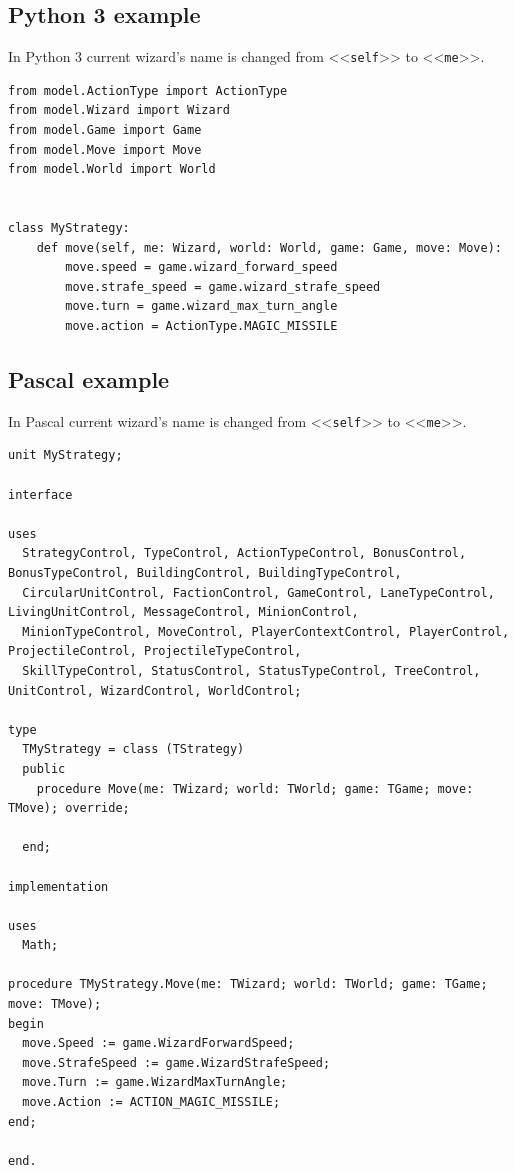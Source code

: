 \subsection{Python 3 example}

In Python 3 current wizard's name is changed from <<\texttt{self}>> to <<\texttt{me}>>.

\begin{verbatim}
from model.ActionType import ActionType
from model.Wizard import Wizard
from model.Game import Game
from model.Move import Move
from model.World import World


class MyStrategy:
    def move(self, me: Wizard, world: World, game: Game, move: Move):
        move.speed = game.wizard_forward_speed
        move.strafe_speed = game.wizard_strafe_speed
        move.turn = game.wizard_max_turn_angle
        move.action = ActionType.MAGIC_MISSILE
\end{verbatim}

\newpage
\subsection{Pascal example}

In Pascal current wizard's name is changed from <<\texttt{self}>> to <<\texttt{me}>>.

\begin{verbatim}
unit MyStrategy;

interface

uses
  StrategyControl, TypeControl, ActionTypeControl, BonusControl, BonusTypeControl, BuildingControl, BuildingTypeControl,
  CircularUnitControl, FactionControl, GameControl, LaneTypeControl, LivingUnitControl, MessageControl, MinionControl,
  MinionTypeControl, MoveControl, PlayerContextControl, PlayerControl, ProjectileControl, ProjectileTypeControl,
  SkillTypeControl, StatusControl, StatusTypeControl, TreeControl, UnitControl, WizardControl, WorldControl;

type
  TMyStrategy = class (TStrategy)
  public
    procedure Move(me: TWizard; world: TWorld; game: TGame; move: TMove); override;

  end;

implementation

uses
  Math;
    
procedure TMyStrategy.Move(me: TWizard; world: TWorld; game: TGame; move: TMove);
begin
  move.Speed := game.WizardForwardSpeed;
  move.StrafeSpeed := game.WizardStrafeSpeed;
  move.Turn := game.WizardMaxTurnAngle;
  move.Action := ACTION_MAGIC_MISSILE;
end;

end.
\end{verbatim}

